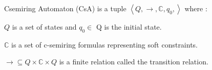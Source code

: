 \begin{definition}
	Csemiring Automaton (CsA) is a tuple $\left\langle Q, \rightarrow, \mathbb{C}, q_{0}, \right\rangle$ where : 
	\begin{list}{-}{ }
		\item $Q$ is a set of states and $q_0\in$ Q is the initial state.
		\item $\mathbb{C}$ is a set of c-semiring formulas representing soft constraints.
		\item $\rightarrow \subseteq Q \times \mathbb{C} \times Q$ is a finite relation called the transition relation. 
	\end{list}
\end{definition}